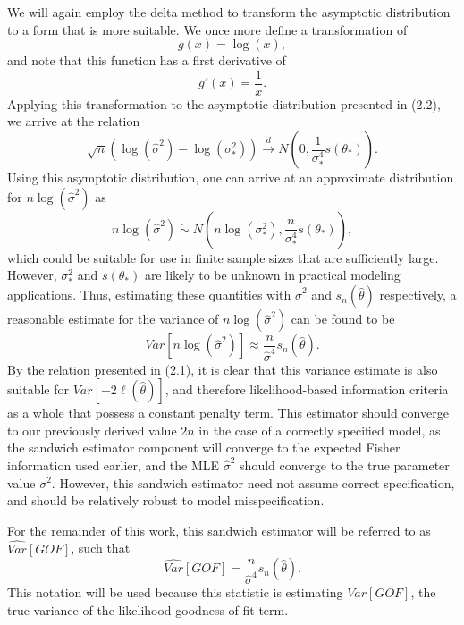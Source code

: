 \documentclass[12pt]{article} %
\theoremstyle{definition}
\begin{document}
		We will again employ the delta method to transform the asymptotic distribution to a form that is more suitable. We once more define a transformation of
		\begin{equation*}
			g(x) = \log(x) ,
		\end{equation*}
		and note that this function has a first derivative of
		\begin{equation*}
			g'(x) = \frac{1}{x} .
		\end{equation*}
		Applying this transformation to the asymptotic distribution presented in (2.2), we arrive at the relation
		\begin{equation*}
			\sqrt{n} ( \log (\hat{\sigma}^2) - \log(\sigma_*^2)) \xrightarrow[]{d} N \left( 0, \frac{1}{\sigma_*^4} s(\theta_*) \right) .
		\end{equation*}
		Using this asymptotic distribution, one can arrive at an approximate distribution for $n\log(\hat{\sigma}^2)$ as
		\begin{equation*}
			n\log(\hat{\sigma}^2) \; \dot\sim \; N \left( n\log(\sigma_* ^2), \frac{n}{\sigma_*^4} s(\theta_*) \right) ,
		\end{equation*}
		which could be suitable for use in finite sample sizes that are sufficiently large. However, $\sigma_*^2$ and $s(\theta_*)$ are likely to be unknown in practical modeling
		applications. Thus, estimating these quantities with $\hat{\sigma}^2$ and $s_n(\hat{\theta})$ respectively, a reasonable estimate for the variance of $n\log(\hat{\sigma}^2)$ can
		be found to be
		\begin{equation*}
			Var \left[ n\log(\hat{\sigma}^2) \right] \approx \frac{n}{\hat{\sigma}^4} s_n(\hat{\theta}) .
		\end{equation*}
		By the relation presented in (2.1), it is clear that this variance estimate is also suitable for $Var \left[ -2 \ell (\hat{\theta}  ) \right]$, and therefore
		likelihood-based information criteria as a whole that possess a constant penalty term. This estimator should converge to our previously derived value $2n$ in the case of a correctly
		specified model, as the sandwich estimator component will converge to the expected Fisher information used earlier, and the MLE $\hat{\sigma}^2$ should converge to the true
		parameter value $\sigma^2$. However, this sandwich estimator need not assume correct specification, and should be relatively robust to model misspecification.
		
		For the remainder of this work, this sandwich estimator will be referred to as $\widehat{Var}[GOF]$, such that
		\begin{equation*}
			\widehat{Var}[GOF] = \frac{n}{\hat{\sigma}^4} s_n(\hat{\theta}) .
		\end{equation*}
		This notation will be used because this statistic is estimating $Var[GOF]$, the true variance of the likelihood goodness-of-fit
		term.
\end{document}
